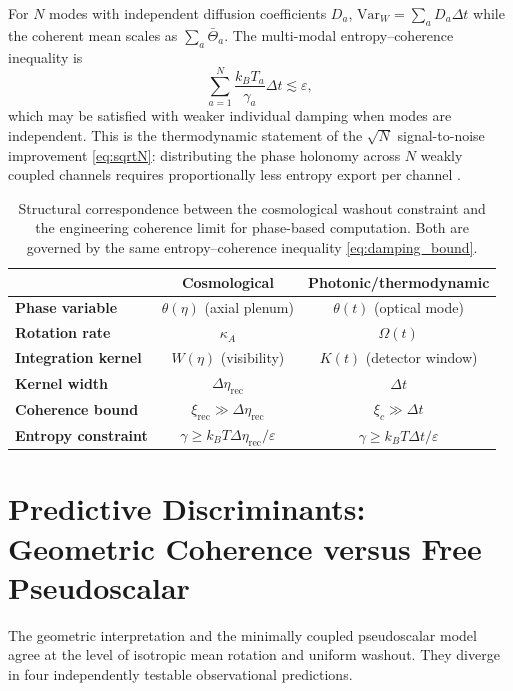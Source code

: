 \documentclass[12pt]{article}
\theoremstyle{definition}
\newcommand{\kA}{\kappa_A}
\newcommand{\Wrec}{\Delta\eta_{\mathrm{rec}}}
\newcommand{\xirec}{\xi_{\mathrm{rec}}}
\newcommand{\VarW}{\mathrm{Var}_W}
\begin{document}
For $N$ modes with independent diffusion coefficients $D_a$,
$\VarW=\sum_aD_a\Delta t$ while the coherent mean scales as
$\sum_a\bar\Theta_a$.
The multi-modal entropy--coherence inequality is
\begin{equation}
  \sum_{a=1}^N \frac{k_BT_a}{\gamma_a}\Delta t \lesssim \varepsilon,
  \label{eq:multimodal_entropy}
\end{equation}
which may be satisfied with weaker individual damping when modes are
independent.
This is the thermodynamic statement of the $\sqrt{N}$ signal-to-noise
improvement \eqref{eq:sqrtN}: distributing the phase holonomy across $N$
weakly coupled channels requires proportionally less entropy export per
channel \cite{Proesmans2020}.

\begin{table}[h]
\centering
\small
\renewcommand{\arraystretch}{1.35}
\begin{tabular}{>{\bfseries}lcc}
  \toprule
  & Cosmological & Photonic/thermodynamic \\
  \midrule
  Phase variable & $\theta(\eta)$ (axial plenum) & $\theta(t)$ (optical mode) \\
  Rotation rate & $\kA$ & $\Omega(t)$ \\
  Integration kernel & $W(\eta)$ (visibility) & $K(t)$ (detector window) \\
  Kernel width & $\Wrec$ & $\Delta t$ \\
  Coherence bound & $\xirec\gg\Wrec$ & $\xi_c\gg\Delta t$ \\
  Entropy constraint & $\gamma\geq k_BT\Wrec/\varepsilon$ & $\gamma\geq k_BT\Delta t/\varepsilon$ \\
  \bottomrule
\end{tabular}
\caption{Structural correspondence between the cosmological washout constraint
  and the engineering coherence limit for phase-based computation.
  Both are governed by the same entropy--coherence inequality
  \eqref{eq:damping_bound}.}
\label{tab:analogy}
\end{table}

\section{Predictive Discriminants: Geometric Coherence versus Free Pseudoscalar}
\label{sec:discriminants}

The geometric interpretation and the minimally coupled pseudoscalar model
agree at the level of isotropic mean rotation and uniform washout.
They diverge in four independently testable observational predictions.
\end{document}
